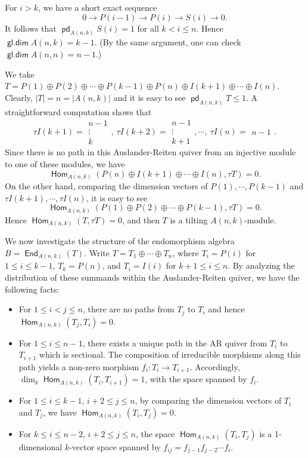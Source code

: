 \documentclass[12pt,a4paper,reqno]{amsart}
\theoremstyle{definition}
\newcommand{\opname}[1]{\operatorname{\mathsf{#1}}}
\newcommand{\pd}{\opname{pd}}
\newcommand{\gld}{\opname{gl.dim}}
\newcommand{\Hom}{\opname{Hom}}
\newcommand{\End}{\opname{End}}
\newcommand{\bsm}{\begin{smallmatrix}}
\newcommand{\esm}{\end{smallmatrix}}
\begin{document}
 For $i > k$, we have a short exact sequence \[0 \to P(i - 1) \to P(i) \to S(i) \to 0.\] It follows that $\pd_{A(n,k)} S(i) = 1$ for all $k < i \leq n$. Hence $\gld A(n, k) = k - 1$. (By the same argument, one can check $\gld A(n, n) = n - 1$.)

We take $T = P(1) \oplus P(2) \oplus \cdots \oplus P(k-1) \oplus P(n) \oplus I(k + 1) \oplus \cdots \oplus I(n)$. Clearly, $|T| = n = |A(n, k)|$ and it is easy to see $\pd_{A(n, k)} T \leq 1$. A straightforward computation shows that
\[
\tau I(k + 1) = {\bsm n-1\\ \vdots \\ k \esm}, ~\tau I(k + 2) = {\bsm n-1\\ \vdots \\ k+1 \esm}, \cdots, ~\tau I(n) = {\bsm n-1 \esm}.
\]
Since there is no path in this Auslander-Reiten quiver from an injective module to one of these modules, we have 
\[ \Hom_{A(n, k)}(P(n) \oplus I(k + 1) \oplus \cdots \oplus I(n), \tau T) = 0.\]
On the other hand, comparing the dimension vectors of $P(1), \cdots, P(k-1)$ and $\tau I(k+1), \cdots, \tau I(n)$, it is easy to see
\[ \Hom_{A(n, k)}(P(1) \oplus P(2) \oplus \cdots \oplus P(k-1), \tau T) = 0.\]
Hence $\Hom_{A(n, k)}(T, \tau T) = 0$, and then $T$ is a tilting $A(n, k)$-module. 

We now investigate the structure of the endomorphism algebra $B = \End_{A(n, k)}(T)$. Write $T = T_1 \oplus \cdots \oplus T_n$, where $T_i = P(i)$ for $1 \leq i \leq k-1$, $T_k = P(n)$, and $T_i = I(i)$ for $k+1 \leq i \leq n$. By analyzing the distribution of these summands within the Auslander-Reiten quiver, we have the following facts:
\begin{itemize}
\item For $1 \leq i < j \leq n$, there are no paths from $T_j$ to $T_i$ and hence $\Hom_{A(n, k)} (T_j, T_i) = 0$. 

\item For $1 \leq i \leq n - 1$, there exists a unique path in the AR quiver from $T_i$ to $T_{i+1}$ which is sectional. The composition of irreducible morphisms along this path yields a non-zero morphism $f_i : T_i \to T_{i+1}$. Accordingly, $\dim_k \Hom_{A(n, k)}(T_i, T_{i+1}) = 1$, with the space spanned by $f_i$.


\item For $1 \leq i \leq k-1$, $i+2 \leq j \leq n$, by comparing the dimension vectors of $T_i$ and $T_j$, we have $\Hom_{A(n, k)} (T_i, T_j) = 0$. 

\item For $k \leq i \leq n-2$, $i+2 \leq j \leq n$, the space $\Hom_{A(n, k)} (T_i, T_j)$ is a 1-dimensional $k$-vector space spanned by $f_{ij} = f_{j-1}f_{j-2}\cdots f_i$.
\end{itemize}
\end{document}
